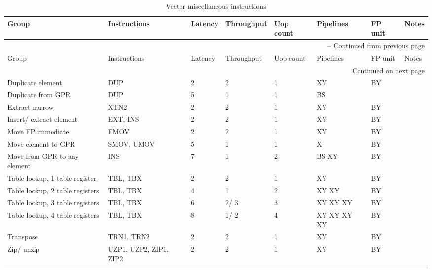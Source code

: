 \begin{longtable}{|p{1in}|p{1in}|l|l|l|p{1in}|l|p{1in}|}
\caption{Vector miscellaneous instructions} \\
\hline
Group & Instructions & Latency & Throughput & Uop count & Pipelines & FP unit & Notes\\
\hline
\endfirsthead
\hline
\multicolumn{8}{|r|}{{\tablename\ \thetable{} -- Continued from previous page}} \\
\hline
Group & Instructions & Latency & Throughput & Uop count & Pipelines & FP unit & Notes\\
\hline
\endhead
\hline
\multicolumn{8}{|r|}{{Continued on next page}} \\
\hline
\endfoot
\hline
\endlastfoot
Duplicate element & DUP & 2 & 2 & 1 & XY & BY & \\
\hline
Duplicate from GPR & DUP & 5 & 1 & 1 & BS &  & \\
\hline
Extract narrow & XTN{{2}} & 2 & 2 & 1 & XY & BY & \\
\hline
Insert/ extract element & EXT, INS & 2 & 2 & 1 & XY & BY & \\
\hline
Move FP immediate & FMOV & 2 & 2 & 1 & XY & BY & \\
\hline
Move element to GPR & SMOV, UMOV & 5 & 1 & 1 & X & BY & \\
\hline
Move from GPR to any element & INS & 7 & 1 & 2 & BS XY & BY & \\
\hline
Table lookup, 1 table register & TBL, TBX & 2 & 2 & 1 & XY & BY & \\
\hline
Table lookup, 2 table registers & TBL, TBX & 4 & 1 & 2 & XY XY & BY & \\
\hline
Table lookup, 3 table registers & TBL, TBX & 6 & 2/ 3 & 3 & XY XY XY & BY & \\
\hline
Table lookup, 4 table registers & TBL, TBX & 8 & 1/ 2 & 4 & XY XY XY XY & BY & \\
\hline
Transpose & TRN1, TRN2 & 2 & 2 & 1 & XY & BY & \\
\hline
Zip/ unzip & UZP1, UZP2, ZIP1, ZIP2 & 2 & 2 & 1 & XY & BY & \\
\hline
\end{longtable}
